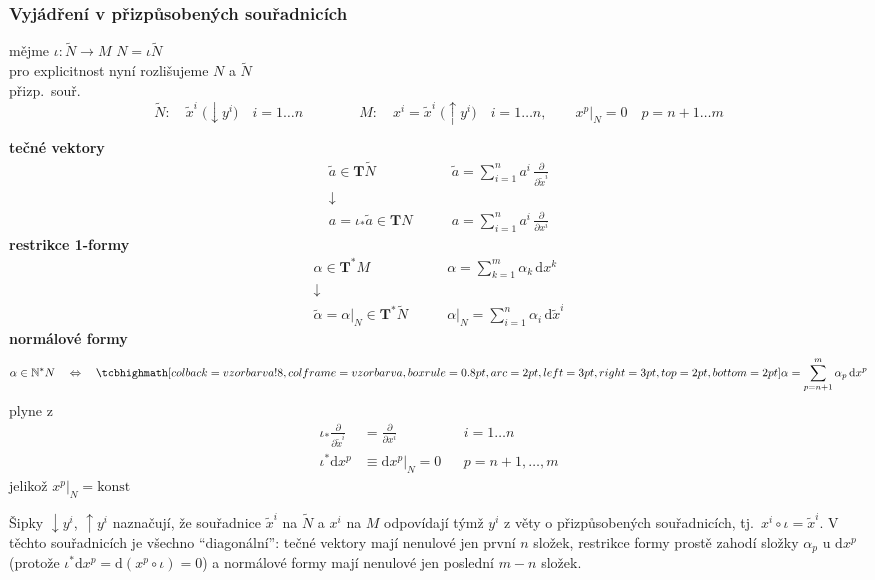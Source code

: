 \subsubsection*{Vyjádření v přizpůsobených souřadnicích}
mějme $\iota: \tilde N\to M$ \qquad $N = \iota\tilde N$ \\
pro explicitnost nyní rozlišujeme $N$ a $\tilde N$ \\
přizp.\ souř.
\[
  \tilde N:\quad \tilde x^{i} \;\big(\downarrow y^{i}\big)\quad i = 1\dots n
  \qquad\qquad
  M:\quad x^{i} = \tilde x^{i} \;\big(\uparrow y^{i}\big)\quad i = 1\dots n, \qquad x^{p}|_N = 0 \quad p = n+1\dots m
\]

\textbf{tečné vektory}
\begin{align*}
  \tilde a\in\mathbf{T}\tilde N &\qquad \tilde a = \sum_{i=1}^{n}a^{i}\,\frac{\partial}{\partial\tilde x^{i}} \\
  \downarrow\qquad & \\
  a = \iota_*\tilde a\in\mathbf{T}N &\qquad a = \sum_{i=1}^{n}a^{i}\,\frac{\partial}{\partial x^{i}}
\end{align*}
\textbf{restrikce 1-formy}
\begin{align*}
  \alpha\in\mathbf{T}^*M &\qquad \alpha = \sum_{k=1}^{m}\alpha_k\,\mathrm{d}x^{k} \\
  \downarrow\qquad & \\
  \tilde\alpha = \alpha|_N\in\mathbf{T}^*\tilde N &\qquad \alpha|_N = \sum_{i=1}^{n}\alpha_i\,\mathrm{d}\tilde x^{i}
\end{align*}
\textbf{normálové formy}
\[
  \alpha\in\mathbb{N}^*N \quad\Leftrightarrow\quad \vzorec{\alpha = \sum_{p=n+1}^{m}\alpha_p\,\mathrm{d}x^{p}}
\]
plyne z
\begin{align*}
  \iota_*\frac{\partial}{\partial\tilde x^{i}} &= \frac{\partial}{\partial x^{i}} && i = 1\dots n \\
  \iota^*\mathrm{d}x^{p} &\equiv \mathrm{d}x^{p}|_N = 0 && p = n+1,\dots,m
\end{align*}
jelikož $x^{p}|_N = \text{konst}$

\begin{vysvetleni}
Šipky $\downarrow y^{i}$, $\uparrow y^{i}$ naznačují, že souřadnice $\tilde x^{i}$ na $\tilde N$ a $x^{i}$ na $M$ odpovídají týmž $y^{i}$ z věty o přizpůsobených souřadnicích, tj.\ $x^{i}\circ\iota=\tilde x^{i}$. V těchto souřadnicích je všechno ``diagonální'': tečné vektory mají nenulové jen první $n$ složek, restrikce formy prostě zahodí složky $\alpha_p$ u $\mathrm{d}x^{p}$ (protože $\iota^*\mathrm{d}x^{p}=\mathrm{d}(x^{p}\circ\iota)=0$) a normálové formy mají nenulové jen poslední $m-n$ složek.
\end{vysvetleni}

